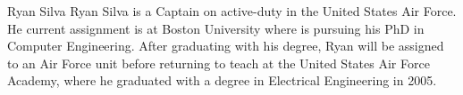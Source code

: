 \documentclass[11pt,journal,compsoc, onecolumn]{IEEEtran}
\begin{document}
\ifCLASSOPTIONcaptionsoff
  \newpage
\fi








\begin{IEEEbiography}{Ryan Silva}
	Ryan Silva is a Captain on active-duty in the United States Air Force.
	He current assignment is at Boston University where is pursuing his
	PhD in Computer Engineering. After graduating with his degree, Ryan
	will be assigned to an Air Force unit before returning to teach at the
	United States Air Force Academy, where he graduated with a degree in
	Electrical Engineering in 2005.
\end{IEEEbiography}
\end{document}
